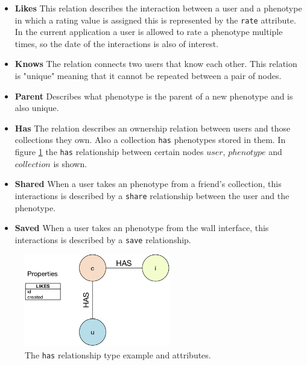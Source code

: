 \documentclass[conference]{IEEEtran}
\begin{document}
\begin{itemize}
\item {\bf Likes} This relation describes the interaction between a user and
a phenotype in which a rating value is assigned this is represented by 
the {\tt rate} attribute. In the current application a user is allowed to rate
a phenotype multiple times, so the date of the interactions is also of
interest.

\item {\bf Knows} The relation connects two users that know each
other. This relation is "unique" meaning that it cannot be repeated
between a pair of nodes.  %

\item {\bf Parent} Describes what phenotype is the parent of a new
  phenotype and is also unique. 

\item {\bf Has} The relation describes an ownership relation between users and
those collections they own. Also a collection {\tt has}  phenotypes stored
in them.  In figure \ref{fig:has} the {\tt has} relationship 
between certain nodes $user$, $phenotype$ and $collection$ is shown.

\item {\bf Shared} When a user takes an phenotype from a friend's collection, this interactions 
is described by a {\tt share} relationship between the user and the
phenotype.  %

\item {\bf Saved} When a user takes an phenotype from the wall interface, this 
interactions is described by a {\tt save} relationship. 
\end{itemize}

  
\begin{figure}[!t]
    \centering
        \includegraphics[width=2.5in]{img/edge_properties_has.png}
    \caption{ The {\tt has} relationship type example and attributes.}
    \label{fig:has}
\end{figure}
\end{document}
